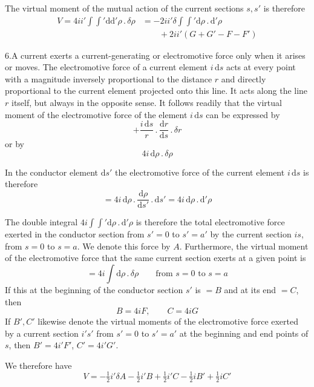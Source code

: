 The virtual moment of the mutual action of the current sections $s,s'$ is therefore
\[
\begin{aligned}
V=4ii'\int\int'\mathrm d\mathrm d'\rho\,.\,\delta\rho&=-2ii'\delta\int\int'\mathrm d\rho\,.\,\mathrm d'\rho\\
&\qquad+2ii'(G+G'-F-F')
\end{aligned}
\]

6.\quad A current exerts a current-generating or electromotive force only when it arises or moves. The electromotive force of a current element $i\,\mathrm ds$ acts at every point with a magnitude inversely proportional to the distance $r$ and directly proportional to the current element projected onto this line. It acts along the line $r$ itself, but always in the opposite sense. It follows readily that the virtual moment of the electromotive force of the element $i\,\mathrm ds$ can be expressed by
\[
+\frac{i\,\mathrm ds}{r}\,.\,\frac{\mathrm dr}{\mathrm ds}\,.\,\delta r
\]
or by
\[
4i\,\mathrm d\rho\,.\,\delta\rho
\]

In the conductor element $\mathrm ds'$ the electromotive force of the current element $i\,\mathrm ds$ is therefore
\[
=4i\,\mathrm d\rho\,.\,\frac{\mathrm d\rho}{\mathrm ds'}\,.\,\mathrm ds'=4i\,\mathrm d\rho\,.\,\mathrm d'\rho
\]

The double integral $4i\int\int'\mathrm d\rho\,.\,\mathrm d'\rho$ is therefore the total electromotive force exerted in the conductor section from $s'=0$ to $s'=a'$ by the current section $is$, from $s=0$ to $s=a$. We denote this force by $A$. Furthermore, the virtual moment of the electromotive force that the same current section exerts at a given point is
\[
=4i\int\mathrm d\rho\,.\,\delta\rho\qquad\text{from }s=0\text{ to }s=a
\]
If this at the beginning of the conductor section $s'$ is $=B$ and at its end $=C$, then
\[
B=4iF,\qquad C=4iG
\]
If $B',C'$ likewise denote the virtual moments of the electromotive force exerted by a current section $i's'$ from $s'=0$ to $s'=a'$ at the beginning and end points of $s$, then $B'=4i'F'$, $C'=4i'G'$.

We therefore have
\[
V=-\tfrac{1}{2}i'\delta A-\tfrac{1}{2}i'B+\tfrac{1}{2}i'C-\tfrac{1}{2}iB'+\tfrac{1}{2}iC'
\]

